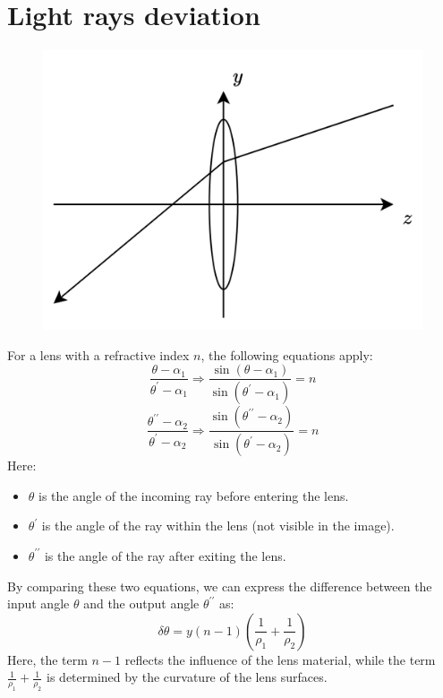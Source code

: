 \section{Light rays deviation}

\begin{figure}[H]
    \centering
    \includegraphics[width=0.4\linewidth]{images/ray.png}
\end{figure}
For a lens with a refractive index $n$, the following equations apply:
\[\dfrac{\theta-\alpha_1}{\theta^\prime-\alpha_1} \Rightarrow \dfrac{\sin{(\theta-\alpha_1)}}{\sin{(\theta^\prime-\alpha_1)}}=n\]
\[\dfrac{\theta^{\prime\prime}-\alpha_2}{\theta^\prime-\alpha_2} \Rightarrow \dfrac{\sin{(\theta^{\prime\prime}-\alpha_2)}}{\sin{(\theta^\prime-\alpha_2)}}=n\]
Here:
\begin{itemize}
    \item $\theta$ is the angle of the incoming ray before entering the lens.
    \item $\theta^\prime$ is the angle of the ray within the lens (not visible in the image).
    \item $\theta^{\prime\prime}$ is the angle of the ray after exiting the lens.
\end{itemize}
By comparing these two equations, we can express the difference between the input angle $\theta$ and the output angle $\theta^{\prime\prime}$ as:
\[\delta \theta=y(n-1)\left( \dfrac{1}{\rho_1} + \dfrac{1}{\rho_2}\right)\]
Here, the term $n-1$ reflects the influence of the lens material, while the term $\frac{1}{\rho_1} + \frac{1}{\rho_2}$ is determined by the curvature of the lens surfaces.